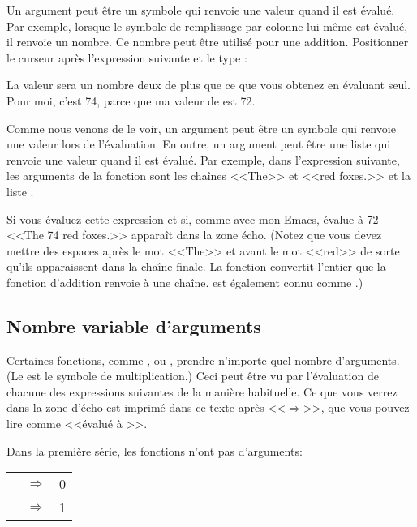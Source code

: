 Un argument peut être un symbole qui renvoie une valeur quand il est
évalué. Par exemple, lorsque le symbole de remplissage par colonne
lui-même est évalué, il renvoie un nombre. Ce nombre peut être utilisé
pour une addition. Positionner le curseur après l'expression suivante
et le type :
\begin{center}
\end{center}

La valeur sera un nombre deux de plus que ce que vous obtenez en
évaluant  seul. Pour moi, c'est 74, parce que ma
valeur de  est 72.

Comme nous venons de le voir, un argument peut être un symbole qui
renvoie une valeur lors de l'évaluation. En outre, un argument peut
être une liste qui renvoie une valeur quand il est évalué. Par
exemple, dans l'expression suivante, les arguments de la fonction
 sont les chaînes <<The>> et <<red foxes.>> et la liste
.
\begin{center}
\end{center}

Si vous évaluez cette expression et si, comme avec mon Emacs,
 évalue à 72---<<The 74 red foxes.>> apparaît dans la
zone écho. (Notez que vous devez mettre des espaces après le mot
<<The>> et avant le mot <<red>> de sorte qu'ils apparaissent dans la
chaîne finale. La fonction  convertit l'entier
que la fonction d'addition renvoie à une chaîne. 
est également connu comme .)


\subsection{Nombre variable d'arguments}

Certaines fonctions, comme , \tm{+} ou \tm{*}, prendre
n'importe quel nombre d'arguments. (Le \tm{*} est le symbole de
multiplication.) Ceci peut être vu par l'évaluation de chacune des
expressions suivantes de la manière habituelle. Ce que vous verrez
dans la zone d'écho est imprimé dans ce texte après <<$\Rightarrow$>>,
que vous pouvez lire comme <<évalué à >>.

Dans la première série, les fonctions n'ont pas d'arguments:
\begin{center}
  \begin{tabular}[m]{lrl}
    \tm{(+)} &$\Rightarrow$ & 0 \\
    \tm{(*)} &$\Rightarrow$ & 1 
  \end{tabular}
\end{center}


